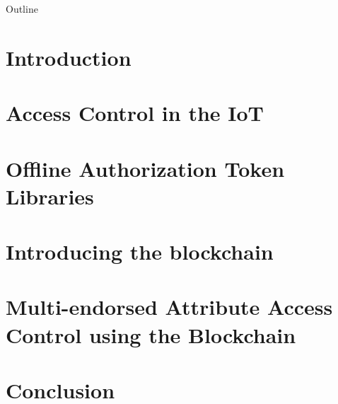 \documentclass{beamer}
\begin{document}
\begin{frame}
  \titlepage
\end{frame}

\begin{frame}{Outline}
  \tableofcontents[hideallsubsections]
\end{frame}


\section{Introduction}



\section{Access Control in the IoT}



\section[OATL]{Offline Authorization Token Libraries}




\section{Introducing the blockchain}




\section[MAAC-B]{Multi-endorsed Attribute Access Control using the Blockchain}




\section{Conclusion}


\end{document}
